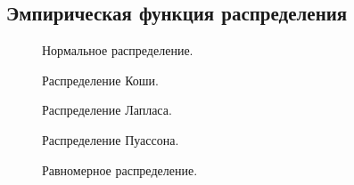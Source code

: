 \subsection{Эмпирическая функция распределения}
\begin{figure}[H]
	\caption{ Нормальное распределение.}
	\label{ris:11}
\end{figure}
\begin{figure}[H]
	\caption{ Распределение Коши.}
	\label{ris:12}
\end{figure}
\begin{figure}[H]
	\caption{ Распределение Лапласа.}
	\label{ris:13}
\end{figure}
\begin{figure}[H]
	\caption{ Распределение Пуассона.}
	\label{ris:14}
\end{figure}
\begin{figure}[H]
	\caption{ Равномерное распределение.}
	\label{ris:15}
\end{figure}

